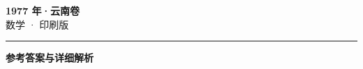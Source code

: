 \documentclass[zihao=5, a4paper]{ctexart}
\begin{document}
\begin{center}
  {\Large\bfseries 1977 年·云南卷}\\[4pt]
  {\large 数学 · 印刷版}
\end{center}
\medskip
{}

\par\bigskip\hrule\bigskip
{}
\begin{center}{\large\bfseries 参考答案与详细解析}\end{center}
\smallskip

\end{document}
